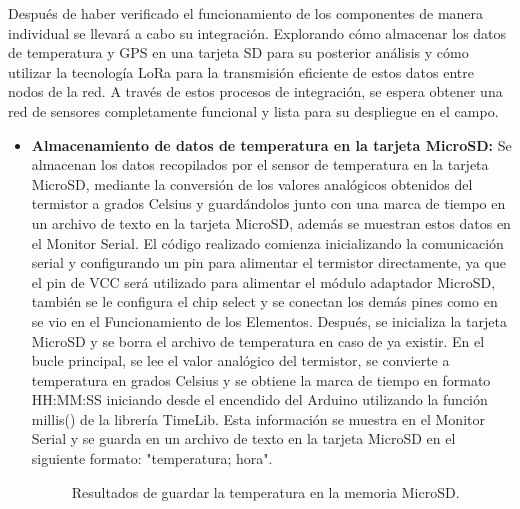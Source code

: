 Después de haber verificado el funcionamiento de los componentes de manera individual se
llevará a cabo su integración. Explorando cómo almacenar los datos de temperatura y GPS en una tarjeta SD para su posterior análisis y cómo utilizar la tecnología LoRa para la transmisión eficiente de estos datos entre nodos de la red. A través de estos procesos de integración, se espera obtener una red de sensores completamente funcional y lista para su despliegue en el campo.
\begin{itemize}
	\item \textbf{Almacenamiento de datos de temperatura en la tarjeta MicroSD:} Se almacenan los datos recopilados por el sensor de temperatura en la tarjeta MicroSD, mediante la conversión de los valores analógicos obtenidos del termistor a grados Celsius y guardándolos junto con una marca de tiempo en un archivo de texto en la tarjeta MicroSD, además se muestran estos datos en el Monitor Serial.
	El código realizado comienza inicializando la comunicación serial y configurando un pin para alimentar el termistor directamente, ya que el pin de VCC será utilizado para alimentar el módulo adaptador MicroSD, también se le configura el chip select y se conectan los demás pines como en se vio en el Funcionamiento de los Elementos. Después, se inicializa la tarjeta MicroSD y se borra el archivo de temperatura en caso de ya existir. 
	En el bucle principal, se lee el valor analógico del termistor, se convierte a temperatura en grados Celsius y se obtiene la marca de tiempo en formato HH:MM:SS iniciando desde el encendido del Arduino utilizando la función millis() de la librería TimeLib. Esta información se muestra en el Monitor Serial y se guarda en un archivo de texto en la tarjeta MicroSD en el siguiente formato: "temperatura; hora".
	\begin{figure}[H]
		\centering
		\quad
		\caption{ Resultados de guardar la temperatura en la memoria MicroSD.}
	\end{figure}
	

\end{itemize}
